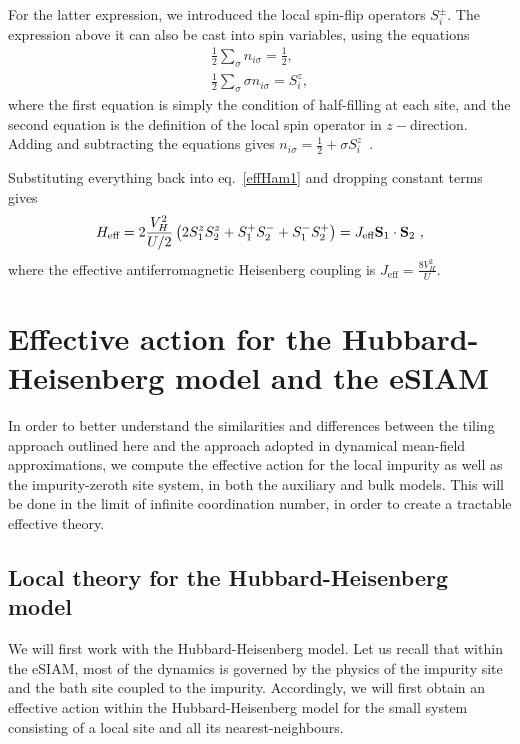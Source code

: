 \documentclass[reprint,hidelinks,onecolumn]{revtex4-2}
\begin{document}
For the latter expression, we introduced the local spin-flip operators \(S_i^\pm\). The expression above it can also be cast into spin variables, using the equations
\begin{equation}\begin{aligned}
	\frac{1}{2}\sum_{\sigma}n_{i\sigma} = \frac{1}{2},\\
    \frac{1}{2}\sum_{\sigma}\sigma n_{i\sigma} = S_i^z,
\end{aligned}\end{equation}
where the first equation is simply the condition of half-filling at each site, and the second equation is the definition of the local spin operator in \(z-\)direction. Adding and subtracting the equations gives \(n_{i\sigma} = \frac{1}{2} + \sigma S_i^z\)~.

Substituting everything back into eq.~\ref{effHam1} and dropping constant terms gives
\begin{equation}\begin{aligned}
	H_\text{eff} = 2\frac{V_H^2}{U/2}\left(2S_1^z S_2^z + S_1^+S_2^- + S_1^-S_2^+\right) = J_\text{eff} {\bf S}_1\cdot{\bf S}_2~,
\end{aligned}\end{equation}
where the effective antiferromagnetic Heisenberg coupling is \(J_\text{eff} = \frac{8V_H^2}{U}\).

\section{Effective action for the Hubbard-Heisenberg model and the eSIAM}
In order to better understand the similarities and differences between the tiling approach outlined here and the approach adopted in dynamical mean-field approximations, we compute the effective action for the local impurity as well as the impurity-zeroth site system, in both the auxiliary and bulk models. This will be done in the limit of infinite coordination number, in order to create a tractable effective theory.

\subsection{Local theory for the Hubbard-Heisenberg model}
We will first work with the Hubbard-Heisenberg model. Let us recall that within the eSIAM, most of the dynamics is governed by the physics of the impurity site and the bath site coupled to the impurity. Accordingly, we will first obtain an effective action within the Hubbard-Heisenberg model for the small system consisting of a local site and all its nearest-neighbours. 
\end{document}
